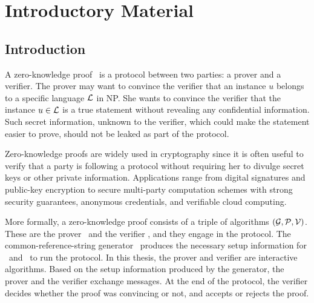 \chapter{Introductory Material}
\label{chapterlabel:Introduction}


\section{Introduction}

A zero-knowledge proof~\cite{GoldwasserMR85} is a protocol between two parties: a prover and a verifier. The prover may want to convince the verifier that an instance $u$ belongs to a specific language $\mathcal{L}$ in NP. She wants to convince the verifier that the instance $u\in \mathcal{L}$ is a true statement without revealing any confidential information. Such secret information, unknown to the verifier, which could make the statement easier to prove, should not be leaked as part of the protocol.

Zero-knowledge proofs are widely used in cryptography since it is often useful to verify that a party is following a protocol without requiring her to divulge secret keys or other private information. Applications range from digital signatures and public-key encryption to secure multi-party computation schemes with strong security guarantees, anonymous credentials, and verifiable cloud computing.

More formally, a zero-knowledge proof consists of a triple of algorithms $(\mathcal{G},\mathcal{P},\mathcal{V})$. These are the prover \prover\ and the verifier \verifier, and they engage in the protocol. The common-reference-string generator \crsgen\ produces the necessary setup information for \prover\ and \verifier\ to run the protocol. In this thesis, the prover and verifier are interactive algorithms. Based on the setup information produced by the generator, the prover and the verifier  exchange messages. At the end of the protocol, the verifier decides whether the proof was convincing or not, and accepts or rejects the proof.

